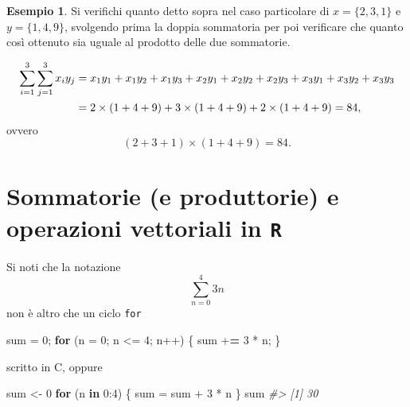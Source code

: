 \documentclass[
]{memoir}
\newenvironment{Shaded}{\begin{snugshade}}{\end{snugshade}}
\newcommand{\AttributeTok}[1]{\textcolor[rgb]{0.77,0.63,0.00}{#1}}
\newcommand{\CommentTok}[1]{\textcolor[rgb]{0.56,0.35,0.01}{\textit{#1}}}
\newcommand{\ControlFlowTok}[1]{\textcolor[rgb]{0.13,0.29,0.53}{\textbf{#1}}}
\newcommand{\DecValTok}[1]{\textcolor[rgb]{0.00,0.00,0.81}{#1}}
\newcommand{\ErrorTok}[1]{\textcolor[rgb]{0.64,0.00,0.00}{\textbf{#1}}}
\newcommand{\NormalTok}[1]{#1}
\newcommand{\OtherTok}[1]{\textcolor[rgb]{0.56,0.35,0.01}{#1}}
\newcommand{\SpecialCharTok}[1]{\textcolor[rgb]{0.00,0.00,0.00}{#1}}
\theoremstyle{definition}
\theoremstyle{definition}
\newtheorem{example}{Esempio}[chapter]
\theoremstyle{definition}
\theoremstyle{definition}
\theoremstyle{remark}
\begin{document}
\begin{example}
Si verifichi quanto detto sopra nel caso particolare di \(x = \{2, 3, 1\}\) e \(y = \{1, 4, 9\}\), svolgendo prima la doppia sommatoria per poi verificare che quanto così ottenuto sia uguale al prodotto delle due sommatorie.

\begin{align}
\sum_{i=1}^3 \sum_{j=1}^3 x_i y_j &= x_1y_1 + x_1y_2 + x_1y_3 + 
x_2y_1 + x_2y_2 + x_2y_3 + 
x_3y_1 + x_3y_2 + x_3y_3 \notag\\
&= 2 \times (1+4+9) + 3 \times (1+4+9) + 2 \times (1+4+9) = 84,\notag
\end{align}
ovvero
\[
(2 + 3 + 1) \times (1+4+9) = 84.
\]
\end{example}

\hypertarget{sommatorie-e-produttorie-e-operazioni-vettoriali-in-r}{%
\section{\texorpdfstring{Sommatorie (e produttorie) e operazioni vettoriali in \texttt{R}}{Sommatorie (e produttorie) e operazioni vettoriali in R}}\label{sommatorie-e-produttorie-e-operazioni-vettoriali-in-r}}

Si noti che la notazione
\[
\sum_{n=0}^4 3n
\]
non è altro che un ciclo \texttt{for}

\begin{Shaded}
\begin{Highlighting}[]
\NormalTok{sum }\OtherTok{=} \DecValTok{0}\NormalTok{;}
\ControlFlowTok{for}\NormalTok{ (}\AttributeTok{n =} \DecValTok{0}\NormalTok{; n }\SpecialCharTok{\textless{}=} \DecValTok{4}\NormalTok{; n}\SpecialCharTok{++}\NormalTok{) \{}
\NormalTok{  sum }\SpecialCharTok{+}\ErrorTok{=} \DecValTok{3} \SpecialCharTok{*}\NormalTok{ n;}
\NormalTok{\}}
\end{Highlighting}
\end{Shaded}

scritto in C, oppure

\begin{Shaded}
\begin{Highlighting}[]
\NormalTok{sum }\OtherTok{\textless{}{-}} \DecValTok{0}
\ControlFlowTok{for}\NormalTok{ (n }\ControlFlowTok{in} \DecValTok{0}\SpecialCharTok{:}\DecValTok{4}\NormalTok{) \{}
\NormalTok{  sum }\OtherTok{=}\NormalTok{ sum }\SpecialCharTok{+} \DecValTok{3} \SpecialCharTok{*}\NormalTok{ n}
\NormalTok{\}}
\NormalTok{sum}
\CommentTok{\#\textgreater{} [1] 30}
\end{Highlighting}
\end{Shaded}
\end{document}
